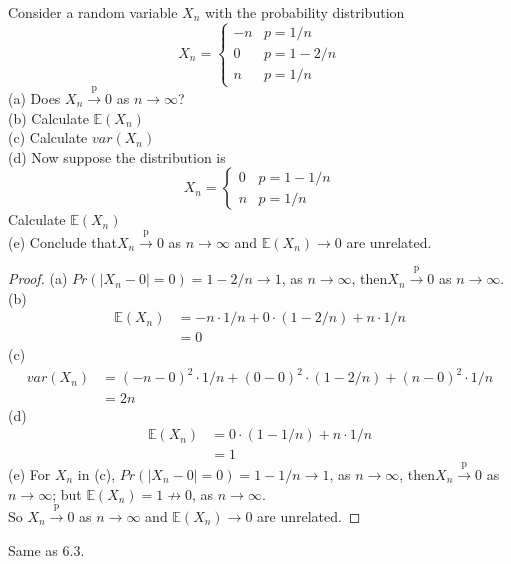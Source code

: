 \documentclass[12pt]{article}
\newenvironment{question}[2][Question]{\begin{trivlist}
\item[\hskip \labelsep {\bfseries #1}\hskip \labelsep {\bfseries #2.}]}{\end{trivlist}}
\begin{document}
\begin{question}{6.4}
Consider a random variable $X_n$ with the probability distribution
 \[
    X_n=\left\{
                \begin{array}{rl}
                  -n & p = 1/n\\
                  0 & p = 1-2/n\\
                  n & p = 1/n
                \end{array}
              \right.
  \]
(a) Does $X_n\xrightarrow{\text{p}}0$ as $n\to \infty$?\\
(b) Calculate $\mathbb{E}(X_n)$\\
(c) Calculate $var(X_n)$\\
(d) Now suppose the distribution is 
 \[
    X_n=\left\{
                \begin{array}{rl}
                  0 & p = 1-1/n\\
                  n & p = 1/n
                \end{array}
              \right.
  \]
  Calculate $\mathbb{E}(X_n)$\\
 (e) Conclude that$X_n\xrightarrow{\text{p}}0$ as $n\to \infty$ and $\mathbb{E}(X_n)\to 0$ are unrelated.
\end{question}

\begin{proof}
(a) $Pr(|X_n - 0| = 0)=1-2/n \to 1$, as $n\to\infty$, then$X_n\xrightarrow{\text{p}}0$ as $n\to \infty$.\\
(b) \begin{align*}
\mathbb{E}(X_n)& = -n\cdot 1/n+0\cdot (1-2/n)+n\cdot 1/n\\
&=0
\end{align*}
(c)  \begin{align*}
var(X_n)& = (-n-0)^2\cdot 1/n+(0-0)^2\cdot (1-2/n)+(n-0)^2\cdot 1/n\\
&=2n
\end{align*}
(d) \begin{align*}
\mathbb{E}(X_n)& = 0\cdot (1-1/n)+n\cdot 1/n\\
&=1
\end{align*}
(e) For $X_n$ in (c), $Pr(|X_n - 0| = 0)=1-1/n \to 1$, as $n\to\infty$, then$X_n\xrightarrow{\text{p}}0$ as $n\to \infty$; but $\mathbb{E}(X_n) = 1 \nrightarrow 0$, as $n \to \infty$.\\
So $X_n\xrightarrow{\text{p}}0$ as $n\to \infty$ and $\mathbb{E}(X_n)\to 0$ are unrelated.
\end{proof}

\begin{question}{6.5}
Same as 6.3.
\end{question}
\end{document}

